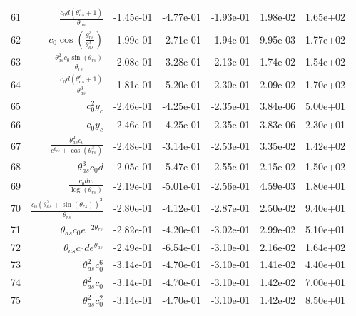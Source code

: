 \begin{tabularx}{\textwidth}{lRRRRRl}
61  &  $ \displaystyle\frac{c_{0} d \left(\theta_{as}^{4} + 1\right)}{\theta_{as}} $  &  -1.45e-01  &  -4.77e-01  &  -1.93e-01  &  1.98e-02  &  1.65e+02  \\ 
62  &  $ c_{0} \cos{\left(\displaystyle\frac{\theta_{rs}^{3}}{\theta_{as}^{3}} \right)} $  &  -1.99e-01  &  -2.71e-01  &  -1.94e-01  &  9.95e-03  &  1.77e+02  \\ 
63  &  $ \displaystyle\frac{\theta_{as}^{2} c_{0} \sin{\left(\theta_{rs} \right)}}{\theta_{rs}} $  &  -2.08e-01  &  -3.28e-01  &  -2.13e-01  &  1.74e-02  &  1.54e+02  \\ 
64  &  $ \displaystyle\frac{c_{0} d \left(\theta_{as}^{6} + 1\right)}{\theta_{as}^{3}} $  &  -1.81e-01  &  -5.20e-01  &  -2.30e-01  &  2.09e-02  &  1.70e+02  \\ 
65  &  $ c_{0}^{2} y_c $  &  -2.46e-01  &  -4.25e-01  &  -2.35e-01  &  3.84e-06  &  5.00e+01  \\ 
66  &  $ c_{0} y_c $  &  -2.46e-01  &  -4.25e-01  &  -2.35e-01  &  3.83e-06  &  2.30e+01  \\ 
67  &  $ \displaystyle\frac{\theta_{as}^{2} c_{0}}{e^{\theta_{rs}} + \cos{\left(\theta_{rs}^{3} \right)}} $  &  -2.48e-01  &  -3.14e-01  &  -2.53e-01  &  3.35e-02  &  1.42e+02  \\ 
68  &  $ \theta_{as}^{3} c_{0} d $  &  -2.05e-01  &  -5.47e-01  &  -2.55e-01  &  2.15e-02  &  1.50e+02  \\ 
69  &  $ \displaystyle\frac{c_{0} d w}{\log{\left(\theta_{rs} \right)}} $  &  -2.19e-01  &  -5.01e-01  &  -2.56e-01  &  4.59e-03  &  1.80e+01  \\ 
70  &  $ \displaystyle\frac{c_{0} \left(\theta_{as}^{2} + \sin{\left(\theta_{rs} \right)}\right)^{2}}{\theta_{rs}} $  &  -2.80e-01  &  -4.12e-01  &  -2.87e-01  &  2.50e-02  &  9.40e+01  \\ 
71  &  $ \theta_{as} c_{0} e^{- 2 \theta_{rs}} $  &  -2.82e-01  &  -4.20e-01  &  -3.02e-01  &  2.99e-02  &  5.10e+01  \\ 
72  &  $ \theta_{as} c_{0} d e^{\theta_{as}} $  &  -2.49e-01  &  -6.54e-01  &  -3.10e-01  &  2.16e-02  &  1.64e+02  \\ 
73  &  $ \theta_{as}^{2} c_{0}^{6} $  &  -3.14e-01  &  -4.70e-01  &  -3.10e-01  &  1.41e-02  &  4.40e+01  \\ 
74  &  $ \theta_{as}^{2} c_{0} $  &  -3.14e-01  &  -4.70e-01  &  -3.10e-01  &  1.42e-02  &  7.00e+01  \\ 
75  &  $ \theta_{as}^{2} c_{0}^{2} $  &  -3.14e-01  &  -4.70e-01  &  -3.10e-01  &  1.42e-02  &  8.50e+01  \\ 

\end{tabularx}
